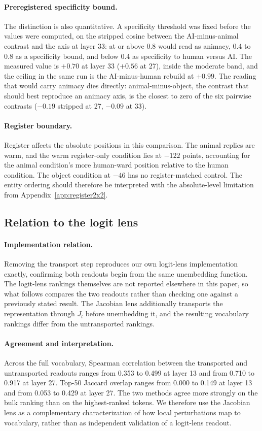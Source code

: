 \paragraph{Preregistered specificity bound.}
The distinction is also quantitative. A specificity threshold was fixed before
the values were computed, on the stripped cosine between the AI-minus-animal
contrast and the axis at layer 33: at or above 0.8 would read as animacy, 0.4 to
0.8 as a specificity bound, and below 0.4 as specificity to human versus AI.
The measured value is $+0.70$ at layer 33 ($+0.56$ at 27), inside the moderate
band, and the ceiling in the same run is the AI-minus-human rebuild at $+0.99$.
The reading that would carry animacy dies directly: animal-minus-object, the
contrast that should best reproduce an animacy axis, is the closest to zero of
the six pairwise contrasts ($-0.19$ stripped at 27, $-0.09$ at 33).

\paragraph{Register boundary.}
Register affects the absolute positions in this comparison. The animal replies
are warm, and the warm register-only condition lies at $-122$ points, accounting
for the animal condition's more human-ward position relative to the human
condition. The object condition at $-46$ has no register-matched control. The
entity ordering should therefore be interpreted with the absolute-level
limitation from Appendix~\ref{app:register2x2}.

\subsection{Relation to the logit lens}

\paragraph{Implementation relation.}
Removing the transport step reproduces our own logit-lens implementation
exactly, confirming both readouts begin from the same unembedding function.
The logit-lens rankings themselves are not reported elsewhere in this paper,
so what follows compares the two readouts rather than checking one against a
previously stated result. The Jacobian lens additionally transports the
representation through
$J_l$ before unembedding it, and the resulting vocabulary rankings differ from
the untransported rankings.

\paragraph{Agreement and interpretation.}
Across the full vocabulary, Spearman correlation between the transported and
untransported readouts ranges from 0.353 to 0.499 at layer 13 and from 0.710 to
0.917 at layer 27. Top-50 Jaccard overlap ranges from 0.000 to 0.149 at layer 13
and from 0.053 to 0.429 at layer 27. The two methods agree more strongly on the
bulk ranking than on the highest-ranked tokens. We therefore use the Jacobian
lens as a complementary characterization of how local perturbations map to
vocabulary, rather than as independent validation of a logit-lens readout.

